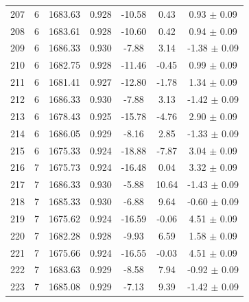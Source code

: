 \begin{longtable}{c c c c c c c}
    207 & 6 & 1683.63 & 0.928 & \cellcolor{aicgreen}-10.58 & 0.43 & 0.93 $\pm$ 0.09 \\
    208 & 6 & 1683.61 & 0.928 & \cellcolor{aicgreen}-10.60 & 0.42 & 0.94 $\pm$ 0.09 \\
    209 & 6 & 1686.33 & 0.930 & \cellcolor{aiclightgreen}-7.88 & \cellcolor{aiclightorange}3.14 & \cellcolor{aicorange}-1.38 $\pm$ 0.09 \\
    210 & 6 & 1682.75 & 0.928 & \cellcolor{aicgreen}-11.46 & -0.45 & 0.99 $\pm$ 0.09 \\
    211 & 6 & 1681.41 & 0.927 & \cellcolor{aicgreen}-12.80 & -1.78 & \cellcolor{aicyellow}1.34 $\pm$ 0.09 \\
    212 & 6 & 1686.33 & 0.930 & \cellcolor{aiclightgreen}-7.88 & \cellcolor{aiclightorange}3.13 & \cellcolor{aicorange}-1.42 $\pm$ 0.09 \\
    213 & 6 & 1678.43 & 0.925 & \cellcolor{aicgreen}-15.78 & \cellcolor{aicyellow}-4.76 & \cellcolor{aicyellow}2.90 $\pm$ 0.09 \\
    214 & 6 & 1686.05 & 0.929 & \cellcolor{aiclightgreen}-8.16 & \cellcolor{aiclightorange}2.85 & \cellcolor{aicorange}-1.33 $\pm$ 0.09 \\
    215 & 6 & 1675.33 & 0.924 & \cellcolor{aicgreen}-18.88 & \cellcolor{aiclightgreen}-7.87 & \cellcolor{aiclightgreen}3.04 $\pm$ 0.09 \\
    216 & 7 & 1675.73 & 0.924 & \cellcolor{aicgreen}-16.48 & 0.04 & \cellcolor{aiclightgreen}3.32 $\pm$ 0.09 \\
    217 & 7 & 1686.33 & 0.930 & \cellcolor{aicyellow}-5.88 & \cellcolor{aicred}10.64 & \cellcolor{aicorange}-1.43 $\pm$ 0.09 \\
    218 & 7 & 1685.33 & 0.930 & \cellcolor{aicyellow}-6.88 & \cellcolor{aiclightred}9.64 & -0.60 $\pm$ 0.09 \\
    219 & 7 & 1675.62 & 0.924 & \cellcolor{aicgreen}-16.59 & -0.06 & \cellcolor{aiclightgreen}4.51 $\pm$ 0.09 \\
    220 & 7 & 1682.28 & 0.928 & \cellcolor{aiclightgreen}-9.93 & \cellcolor{aiclightred}6.59 & \cellcolor{aicyellow}1.58 $\pm$ 0.09 \\
    221 & 7 & 1675.66 & 0.924 & \cellcolor{aicgreen}-16.55 & -0.03 & \cellcolor{aiclightgreen}4.51 $\pm$ 0.09 \\
    222 & 7 & 1683.63 & 0.929 & \cellcolor{aiclightgreen}-8.58 & \cellcolor{aiclightred}7.94 & -0.92 $\pm$ 0.09 \\
    223 & 7 & 1685.08 & 0.929 & \cellcolor{aiclightgreen}-7.13 & \cellcolor{aiclightred}9.39 & \cellcolor{aicorange}-1.42 $\pm$ 0.09 \\

\end{longtable}
